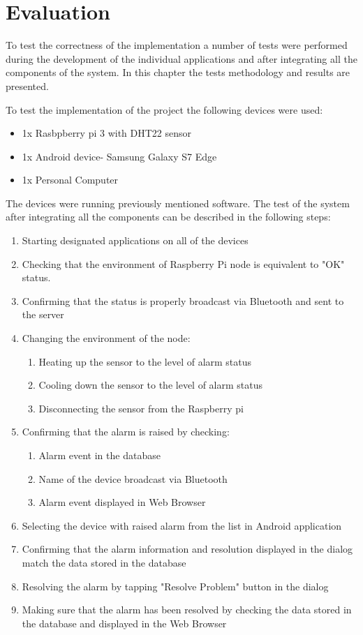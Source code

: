 \chapter{Evaluation}
\label{cha:evaluation}

To test the correctness of the implementation a number of tests were performed during the development of the individual applications and after integrating all the components of the system. In this chapter the tests methodology and results are presented.

To test the implementation of the project the following devices were used:

\begin{itemize}
\item 1x Rasbpberry pi 3 with DHT22 sensor 
\item 1x Android device- Samsung Galaxy S7 Edge
\item 1x Personal Computer
\end{itemize}

The devices were running previously mentioned software. The test of the system after integrating all the components can be described in the following steps:

\begin{enumerate}
\item Starting designated applications on all of the devices
\item Checking that the environment of Raspberry Pi node is equivalent to "OK" status.
\item Confirming that the status is properly broadcast via Bluetooth and sent to the server
\item Changing the environment of the node:
	\begin{enumerate}
	\item Heating up the sensor to the level of alarm status
	\item Cooling down the sensor to the level of alarm status
	\item Disconnecting the sensor from the Raspberry pi
	\end{enumerate}
\item Confirming that the alarm is raised by checking:
 \begin{enumerate}
	\item Alarm event in the database
	\item Name of the device broadcast via Bluetooth
	\item Alarm event displayed in Web Browser
	\end{enumerate}
\item Selecting the device with raised alarm from the list in Android application  
\item Confirming that the alarm information and resolution displayed in the dialog match the data stored in the database
\item Resolving the alarm by tapping "Resolve Problem" button in the dialog
\item Making sure that the alarm has been resolved by checking the data stored in the database and displayed in the Web Browser
\end{enumerate}

